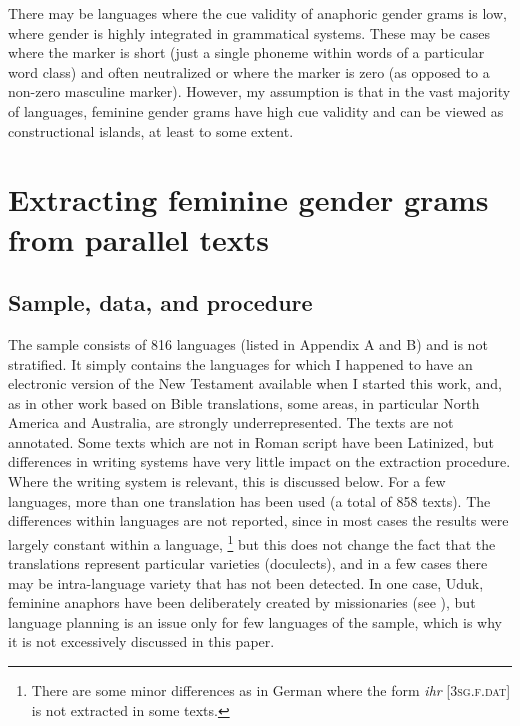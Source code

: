 \documentclass[output=collectionpaper]{langsci/langscibook}
\begin{document}
There may be languages where the cue validity of anaphoric gender grams is low, where gender is highly integrated in grammatical systems. These may be cases where the marker is short (just a single phoneme within words of a particular word class) and often neutralized or where the marker is zero (as opposed to a non-zero masculine marker). However, my assumption is that in the vast majority of languages, feminine gender grams have high cue validity and can be viewed as constructional islands, at least to some extent.


\section{Extracting feminine gender grams from parallel texts}
\label{sec:BW:3}

\subsection{Sample, data, and procedure}
\label{sec:BW:3.1}

The sample consists of 816 languages (listed in Appendix A and B) and is not stratified. It simply contains the languages for which I happened to have an electronic version of the New Testament available when I started this work, and, as in other work based on Bible translations, some areas, in particular North America and Australia, are strongly underrepresented. The texts are not annotated. Some texts which are not in Roman script have been Latinized, but differences in writing systems have very little impact on the extraction procedure. Where the writing system is relevant, this is discussed below. For a few languages, more than one translation has been used (a total of 858 texts). The differences within languages are not reported, since in most cases the results were largely constant within a language,%
\footnote{%
There are some minor differences as in German where the form \textit{ihr} [\textsc{3sg.f.dat}] is not extracted in some texts.
} %
but this does not change the fact that the translations represent particular varieties (doculects), and in a few cases there may be intra-language variety that has not been detected. In one case, Uduk, feminine anaphors have been deliberately created by missionaries (see ), but language planning is an issue only for few languages of the sample, which is why it is not excessively discussed in this paper.
\end{document}
